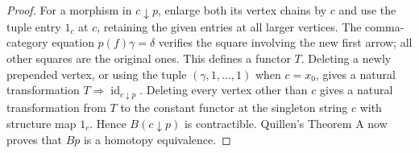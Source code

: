 \begin{proof}
For a morphism in $c\downarrow p$, enlarge both its vertex chains by
$c$ and use the tuple entry $1_c$ at $c$, retaining the given entries
at all larger vertices.  The comma-category equation
$p(f)\gamma=\delta$ verifies the square involving the new first
arrow; all other squares are the original ones.  This defines a
functor $T$.  Deleting a newly prepended vertex, or using the tuple
$(\gamma,1,\ldots,1)$ when $c=x_0$, gives a natural transformation
$T\Rightarrow\operatorname{id}_{c\downarrow p}$.
Deleting every vertex other than $c$ gives a natural transformation
from $T$ to the constant functor at the singleton string $c$ with
structure map $1_c$.  Hence $B(c\downarrow p)$ is contractible.
Quillen's Theorem A \cite[\S1, Theorem A]{quillen1973D} now proves
that $Bp$ is a homotopy equivalence.
\end{proof}

